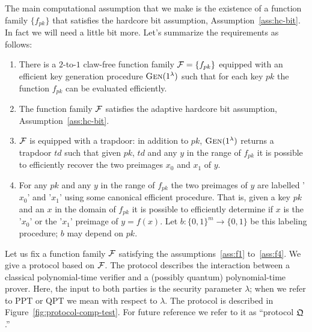  The main computational assumption that we make is the existence of a function family $\{f_{pk}\}$ that satisfies the hardcore bit assumption, Assumption~\ref{ass:hc-bit}. In fact we will need a little bit more. Let's summarize the requirements as follows:
\begin{enumerate}[label=(\textbf{F.\arabic*})]
\item\label{ass:f1} There is a $2$-to-$1$ claw-free function family $\mathcal{F} = \{f_{pk}\}$ equipped with an efficient key generation procedure $\textsc{Gen}(1^\lambda)$ such that for each key $pk$ the function $f_{pk}$ can be evaluated efficiently.
\item \label{ass:f2}The function family $\mathcal{F}$ satisfies the adaptive hardcore bit assumption, Assumption~\ref{ass:hc-bit}.
\item\label{ass:f3} $\mathcal{F}$ is equipped with a trapdoor: in addition to $pk$, $\textsc{Gen}(1^\lambda)$ returns a trapdoor $td$ such that given $pk$, $td$ and any $y$ in the range of $f_{pk}$ it is possible to efficiently recover the two preimages $x_0$ and $x_1$ of $y$. 
\item\label{ass:f4} For any $pk$ and any $y$ in the range of $f_{pk}$ the two preimages of $y$ are labelled '$x_0$' and '$x_1$' using some canonical efficient procedure. That is, given a key $pk$ and an $x$ in the domain of $f_{pk}$ it is possible to efficiently determine if $x$ is the '$x_0$' or the '$x_1$' preimage of $y=f(x)$. Let $b:\{0,1\}^m \to \{0,1\}$ be this labeling procedure; $b$ may depend on $pk$. 
\end{enumerate}
Let us fix a function family $\mathcal{F}$ satisfying the assumptions~\ref{ass:f1} to~\ref{ass:f4}. We give a protocol based on $\mathcal{F}$. The protocol describes the interaction between a classical polynomial-time verifier and a (possibly quantum) polynomial-time prover. Here, the input to both parties is the security parameter $\lambda$; when we refer to PPT or QPT we mean with respect to $\lambda$. The protocol is described in Figure~\ref{fig:protocol-comp-test}. For future reference we refer to it as ``protocol $\mathfrak{Q}$.''

